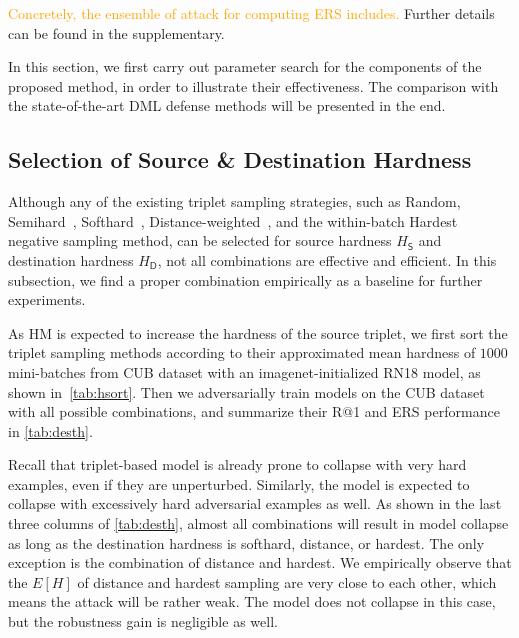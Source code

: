 \documentclass[10pt,twocolumn,letterpaper]{article}
\newcommand{\oo}[1]{\textcolor{orange}{#1}}
\begin{document}
\oo{Concretely, the ensemble of attack for computing ERS includes.}
%
Further details can be found in the supplementary.

In this section, we first carry out parameter search for the components of the
proposed method, in order to illustrate their effectiveness.
%
The comparison with the state-of-the-art DML defense methods will be presented in the end.

\subsection{Selection of Source \& Destination Hardness}
\label{sec:41}








Although any of the existing triplet sampling strategies, such as Random,
Semihard~\cite{facenet}, Softhard~\cite{revisiting},
Distance-weighted~\cite{distance}, and the within-batch Hardest negative
sampling method, can be selected for source hardness $H_\mathsf{S}$ and
destination hardness $H_\mathsf{D}$, not all combinations are effective and
efficient.
%
In this subsection, we find a proper combination empirically as a baseline for
further experiments.


As HM is expected to increase the hardness of the source triplet, we first sort
the triplet sampling methods according to their approximated mean hardness of
$1000$ mini-batches from CUB dataset with an imagenet-initialized RN18 model,
as shown in~\cref{tab:hsort}.
%
Then we adversarially train models on the CUB dataset with all possible
combinations, and summarize their R@1 and ERS performance in \cref{tab:desth}.


Recall that triplet-based model is already prone to collapse with very hard
examples, even if they are unperturbed.
%
Similarly, the model is expected to collapse with excessively hard adversarial
examples as well.
%
As shown in the last three columns of \cref{tab:desth}, almost all combinations
will result in model collapse as long as the destination hardness is softhard,
distance, or hardest.
%
The only exception is the combination of distance and hardest.
%
We empirically observe that the $E[H]$ of distance and hardest sampling are
very close to each other, which means the attack will be rather weak.
%
The model does not collapse in this case, but the robustness gain is negligible
as well.
\end{document}
